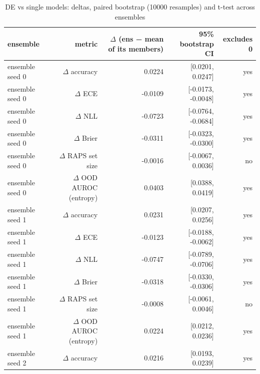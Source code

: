 \begin{table}
\centering
\caption{DE vs single models: deltas, paired bootstrap (10000 resamples) and t-test across ensembles}
\label{tab:de_significance}
\begin{tabular}{lrrrr}
\toprule
                  ensemble &                metric & $\Delta$ (ens − mean of its members) &   95\% bootstrap CI &  excludes 0 \\
\midrule
           ensemble seed 0 &            $\Delta$ accuracy &                        0.0224 &   [0.0201, 0.0247] &         yes \\
           ensemble seed 0 &                 $\Delta$ ECE &                       -0.0109 & [-0.0173, -0.0048] &         yes \\
           ensemble seed 0 &                 $\Delta$ NLL &                       -0.0723 & [-0.0764, -0.0684] &         yes \\
           ensemble seed 0 &               $\Delta$ Brier &                       -0.0311 & [-0.0323, -0.0300] &         yes \\
           ensemble seed 0 &       $\Delta$ RAPS set size &                       -0.0016 &  [-0.0067, 0.0036] &          no \\
           ensemble seed 0 & $\Delta$ OOD AUROC (entropy) &                        0.0403 &   [0.0388, 0.0419] &         yes \\
           ensemble seed 1 &            $\Delta$ accuracy &                        0.0231 &   [0.0207, 0.0256] &         yes \\
           ensemble seed 1 &                 $\Delta$ ECE &                       -0.0123 & [-0.0188, -0.0062] &         yes \\
           ensemble seed 1 &                 $\Delta$ NLL &                       -0.0747 & [-0.0789, -0.0706] &         yes \\
           ensemble seed 1 &               $\Delta$ Brier &                       -0.0318 & [-0.0330, -0.0306] &         yes \\
           ensemble seed 1 &       $\Delta$ RAPS set size &                       -0.0008 &  [-0.0061, 0.0046] &          no \\
           ensemble seed 1 & $\Delta$ OOD AUROC (entropy) &                        0.0224 &   [0.0212, 0.0236] &         yes \\
           ensemble seed 2 &            $\Delta$ accuracy &                        0.0216 &   [0.0193, 0.0239] &         yes \\

\end{tabular}
\end{table}
